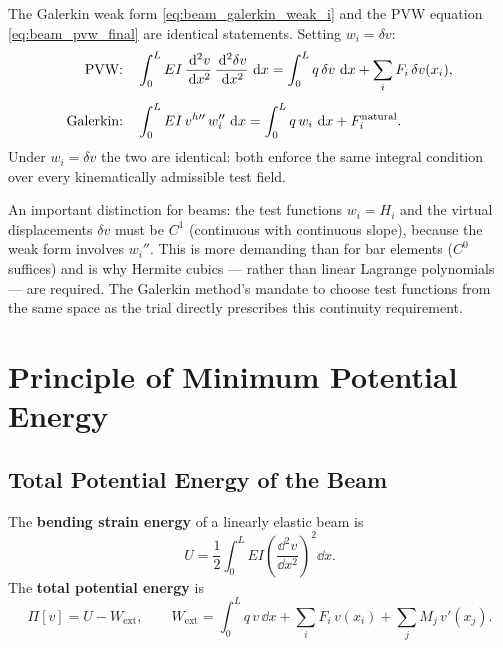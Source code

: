 The Galerkin weak form \cref{eq:beam_galerkin_weak_i} and the PVW equation
\cref{eq:beam_pvw_final} are identical statements. Setting $w_i = \delta v$:
\begin{align}
    \text{PVW:}\quad
    &\int_0^L EI\,\frac{\,\mathrm{d}^2 v}{\,\mathrm{d} x^2}\,\frac{\,\mathrm{d}^2 \delta v}{\,\mathrm{d} x^2}\,\,\mathrm{d} x
     = \int_0^L q\,\delta v\,\,\mathrm{d} x + \sum_i F_i\,\delta v(x_i), \notag \\[4pt]
    \text{Galerkin:}\quad
    &\int_0^L EI\,v^{h\prime\prime}\,w_i''\,\,\mathrm{d} x
     = \int_0^L q\,w_i\,\,\mathrm{d} x + F_i^{\mathrm{natural}} .
    \label{eq:beam_galerkin_pvw_comparison}
\end{align}
Under $w_i = \delta v$ the two are identical: both enforce the same integral
condition over every kinematically admissible test field.

\begin{remark}
An important distinction for beams: the test functions $w_i = H_i$ and the
virtual displacements $\delta v$ must be $C^1$ (continuous with continuous
slope), because the weak form involves $w_i''$. This is more demanding than
for bar elements ($C^0$ suffices) and is why Hermite cubics — rather than
linear Lagrange polynomials — are required. The Galerkin method's mandate to
choose test functions from the same space as the trial directly prescribes
this continuity requirement.
\end{remark}

\section{Principle of Minimum Potential Energy}
\label{sec:beam_pmpe}

\subsection{Total Potential Energy of the Beam}

\begin{definition}
The \textbf{bending strain energy} of a linearly elastic beam is
\begin{equation}
    U = \frac{1}{2}\int_0^L EI\!\left(\frac{\dd^2 v}{\dd x^2}\right)^{\!2}\dd x .
    \label{eq:beam_pmpe_strain_energy}
\end{equation}
The \textbf{total potential energy} is
\begin{equation}
    \Pi[v] = U - W_{\mathrm{ext}},
    \qquad
    W_{\mathrm{ext}} = \int_0^L q\,v\,\dd x + \sum_i F_i\,v(x_i)
                                               + \sum_j M_j\,v'(x_j) .
    \label{eq:beam_pmpe_tpe}
\end{equation}
\end{definition}


